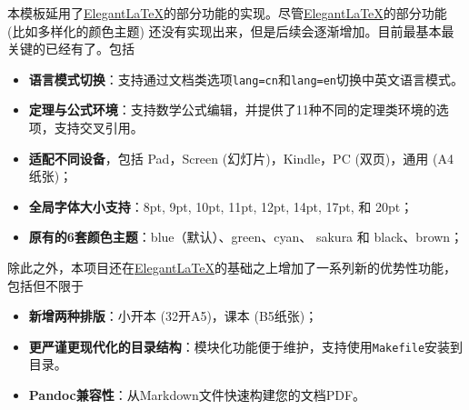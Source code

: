 本模板延用了\href{https://github.com/ElegantLaTeX/}{Elegant\LaTeX}的部分功能的实现。尽管\href{https://github.com/ElegantLaTeX/}{Elegant\LaTeX}的部分功能 (比如多样化的颜色主题) 还没有实现出来，但是后续会逐渐增加。目前最基本最关键的已经有了。包括
\begin{itemize}
  \item \textbf{语言模式切换}：支持通过文档类选项\texttt{lang=cn}和\texttt{lang=en}切换中英文语言模式。
  \item \textbf{定理与公式环境}：支持数学公式编辑，并提供了11种不同的定理类环境的选项，支持交叉引用。
  \item \textbf{适配不同设备}，包括 Pad，Screen (幻灯片)，Kindle，PC (双页)，通用 (A4 纸张)；
  \item \textbf{全局字体大小支持}：8pt, 9pt, 10pt, 11pt, 12pt, 14pt, 17pt, 和 20pt；
  \item \textbf{原有的6套颜色主题}：\textcolor{elegantblue}{blue}（默认）、\textcolor{elegantgreen}{green}、\textcolor{elegantcyan}{cyan}、 \textcolor{elegantsakura}{sakura} 和 \textcolor{elegantblack}{black}、\textcolor{elegantbrown}{brown}；
\end{itemize}

除此之外，本项目还在\href{https://github.com/ElegantLaTeX/}{Elegant\LaTeX}的基础之上增加了一系列新的优势性功能，包括但不限于
\begin{itemize}
  \item \textbf{新增两种排版}：小开本 (32开A5)，课本 (B5纸张)；
  \item \textbf{更严谨更现代化的目录结构}：模块化功能便于维护，支持使用\texttt{Makefile}安装到目录。
  \item \textbf{Pandoc兼容性}：从Markdown文件快速构建您的文档PDF。
\end{itemize}